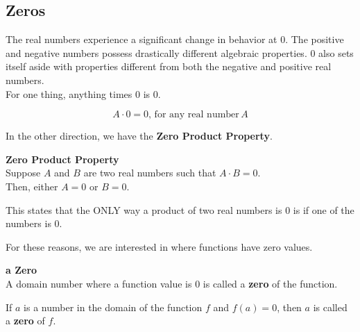 \documentclass{ximera}
\begin{document}
\subsection{Zeros}

The real numbers experience a significant change in behavior at $0$.  The positive and negative numbers possess drastically different algebraic properties.  $0$ also sets itself aside with properties different from both the negative and positive real numbers. \\


For one thing, anything times $0$ is $0$.


\[
A \cdot 0 = 0, \, \text{for any real number} \, A
\]

In the other direction, we have the \textbf{\textcolor{purple!85!blue}{Zero Product Property}}.  








\begin{definition}  \textbf{\textcolor{green!50!black}{Zero Product Property}} \\


Suppose $A$ and $B$ are two real numbers such that $A \cdot B = 0$. \\


Then, either $A = 0$ or $B = 0$.




\end{definition}









This states that the ONLY way a product of two real numbers is $0$ is if one of the numbers is $0$.

For these reasons, we are interested in where functions have zero values.






\begin{definition}  \textbf{\textcolor{green!50!black}{a Zero}} \\


A domain number where a function value is $0$ is called a \textbf{zero} of the function.


\begin{center}
If $a$ is a number in the domain of the function $f$ and $f(a) = 0$, then $a$ is called a \textbf{zero} of $f$.
\end{center}




\end{definition}
\end{document}
